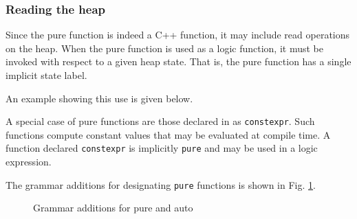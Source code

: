 \subsubsection*{Reading the heap}
Since the pure function is indeed a C++ function, it may include read operations on the heap. When the pure function is used as a logic function,
it must be invoked with respect to a given heap state. 
That is, the pure function has a single implicit state label.


An example showing this use is given below.



A special case of pure functions are those declared in \lang as \lstinline|constexpr|.
Such functions compute constant values that may be evaluated at compile time. A function declared \lstinline|constexpr| is implicitly \lstinline|pure| and may be used in a logic expression.

The grammar additions for designating \lstinline|pure| functions is shown in Fig. \ref{fig:gram:pure}.


\begin{figure}[htp]
\begin{cadre}

\end{cadre}
\caption{Grammar additions for pure and auto}
\label{fig:gram:pure}
\end{figure}


